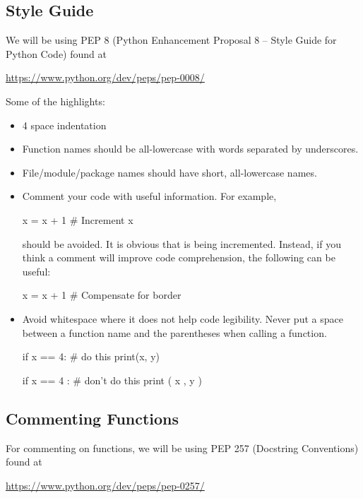 \documentclass[11pt]{cselabheader}
\begin{document}
\subsection{Style Guide}

We will be using PEP 8 (Python Enhancement Proposal 8 -- Style Guide for Python
Code) found at
\begin{center}
  \url{https://www.python.org/dev/peps/pep-0008/}
\end{center}

Some of the highlights:
\begin{itemize}
  \item 4 space indentation
  \item Function names should be all-lowercase with words separated by underscores.
  \item File/module/package names should have short, all-lowercase names.
  \item Comment your code with useful information. For example,

    \begin{python3code}
x = x + 1 # Increment x
    \end{python3code}

    should be avoided. It is obvious that  is being incremented.
    Instead, if you think a comment will improve code comprehension, the
    following can be useful:

    \begin{python3code}
x = x + 1 # Compensate for border
    \end{python3code}

  \item Avoid whitespace where it does not help code legibility. Never put a
    space between a function name and the parentheses when calling a function.

    \begin{python3code}
if x == 4: # do this
    print(x, y)

if x == 4 : # don't do this
    print ( x , y )
    \end{python3code}
\end{itemize}

\pagebreak
\subsection{Commenting Functions}

For commenting on functions, we will be using PEP 257 (Docstring Conventions)
found at
\begin{center}
  \url{https://www.python.org/dev/peps/pep-0257/}
\end{center}
\end{document}
